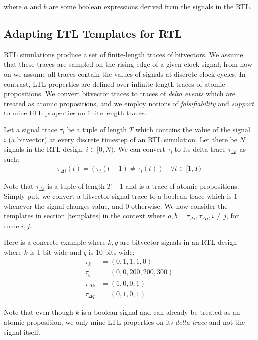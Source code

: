 \documentclass[acmlarge,11pt]{acmart}
\begin{document}
where $a$ and $b$ are some boolean expressions derived from the signals in the RTL.

\subsection{Adapting LTL Templates for RTL}
RTL simulations produce a set of finite-length traces of bitvectors.
We assume that these traces are sampled on the rising edge of a given clock signal; from now on we assume all traces contain the values of signals at discrete clock cycles.
In contrast, LTL properties are defined over infinite-length traces of atomic propositions.
We convert bitvector traces to traces of \textit{delta events} which are treated as atomic propositions, and we employ notions of \textit{falsifiability} and \textit{support} to mine LTL properties on finite length traces.

Let a signal trace $\tau_i$ be a tuple of length $T$ which contains the value of the signal $i$ (a bitvector) at every discrete timestep of an RTL simulation.
Let there be $N$ signals in the RTL design: $i \in [0,N)$.
We can convert $\tau_i$ to its delta trace $\tau_{\Delta i}$ as such:
\begin{align*}
  \tau_{\Delta i}(t) = (\tau_i(t-1) \neq \tau_i(t)) \quad \forall t \in [1,T)
\end{align*}

Note that $\tau_{\Delta i}$ is a tuple of length $T-1$ and is a trace of atomic propositions.
Simply put, we convert a bitvector signal trace to a boolean trace which is 1 whenever the signal changes value, and 0 otherwise.
We now consider the templates in section \ref{templates} in the context where $a, b = \tau_{\Delta i}, \tau_{\Delta j}, i \neq j$, for some $i, j$.

Here is a concrete example where $k, q$ are bitvector signals in an RTL design where $k$ is 1 bit wide and $q$ is 10 bits wide:
\begin{align*}
  \tau_{k} &= (0, 1, 1, 1, 0) \\
  \tau_{q} &= (0, 0, 200, 200, 300) \\
  \tau_{\Delta k} &= (1, 0, 0, 1) \\
  \tau_{\Delta q} &= (0, 1, 0, 1)
\end{align*}

Note that even though $k$ is a boolean signal and can already be treated as an atomic proposition, we only mine LTL properties on its \textit{delta trace} and not the signal itself.
\end{document}
